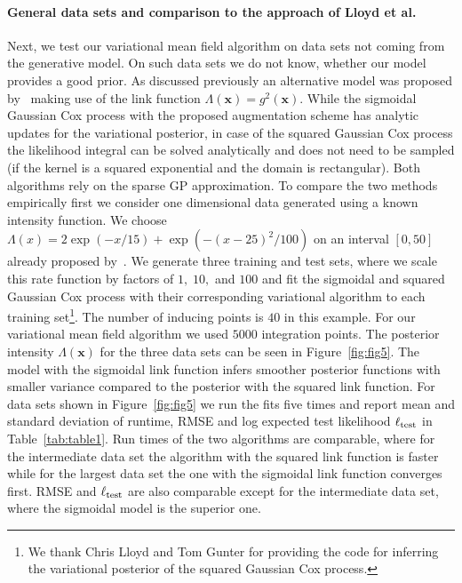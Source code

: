 \documentclass[twoside,11pt]{article}
\newcommand{\bx}{\boldsymbol{x}}
\begin{document}
\paragraph{General data sets and comparison to the approach of Lloyd et al.} Next, we test our variational mean field algorithm on data sets not coming from the generative model. On such data sets we do not know, whether our model provides a good prior. As discussed previously an alternative model was proposed by~\citet{lloyd2015variational} making use of the link function $\Lambda(\bx)=g^2(\bx)$. While the sigmoidal Gaussian Cox process with the proposed augmentation scheme has analytic updates for the variational posterior, in case of the squared Gaussian Cox process the likelihood integral can be solved analytically and does not need to be sampled (if the kernel is a squared exponential and the domain is rectangular). Both algorithms rely on the sparse GP approximation. To compare the two methods empirically first we consider one dimensional data generated using a known intensity function. We choose $\Lambda(x)=2\exp(-x/15) + \exp(-(x-25)^2/100)$ on an interval $[0,50]$ already proposed by~\citet{adams2009tractable}. We generate three training and test sets, where we scale this rate function by factors of $1,\;10,$ and $100$ and fit the sigmoidal and squared Gaussian Cox process with their corresponding variational algorithm to each training set\footnote{We thank Chris Lloyd and Tom Gunter for providing the code for inferring the variational posterior of the squared Gaussian Cox process.}. The number of inducing points is $40$ in this example. For our variational mean field algorithm we used $5000$ integration points. The posterior intensity $\Lambda(\bx)$ for the three data sets can be seen in Figure~\ref{fig:fig5}. The model with the sigmoidal link function infers smoother posterior functions with smaller variance compared to the posterior with the squared link function. For data sets shown in Figure~\ref{fig:fig5} we run the fits five times and report mean and standard deviation of runtime, RMSE and log expected test likelihood $\ell_{\rm test}$ in Table~\ref{tab:table1}. Run times of the two algorithms are comparable, where for the intermediate data set the algorithm with the squared link function is faster while for the largest data set the one with the sigmoidal link function converges first. RMSE and $\ell_{\rm test}$ are also comparable except for the intermediate data set, where the sigmoidal model is the superior one.
\end{document}
